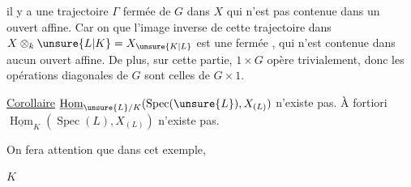 il y a  une trajectoire $\Gamma$ fermée de $G$ dans $X$ qui n'est pas contenue dans un ouvert affine. Car on \uline{} que l'image inverse de cette trajectoire dans $X\otimes_k\unsure{L|K}=X_{\unsure{K|L}}$ est  une   fermée , qui n'est contenue dans aucun ouvert affine.  De plus, sur cette partie, $1\times G$ opère trivialement, donc les opérations  diagonales de $G$ sont celles de $G\times1$.

\uline{Corollaire} $\underline{\operatorname{Hom}}_{\unsure{L}/K}(\operatorname{Spec}(\unsure{L}),X_{(L)})$ n'existe pas. À fortiori $\underline{\operatorname{Hom}}_K(\operatorname{Spec}(L),X_{(L)})$ n'existe pas.

On fera attention que dans cet exemple,

$K$
